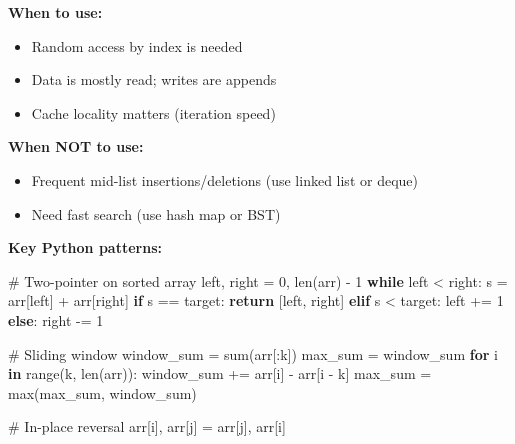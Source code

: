 \documentclass[11pt]{article}
\providecommand{\tightlist}{\setlength{\itemsep}{1pt}\setlength{\parskip}{0pt}}
\newenvironment{Shaded}{\begin{snugshade}}{\end{snugshade}}
\newcommand{\BuiltInTok}[1]{\textcolor[rgb]{0.50,0.55,0.55}{#1}}
\newcommand{\CommentTok}[1]{\textcolor[rgb]{0.48,0.49,0.49}{#1}}
\newcommand{\ControlFlowTok}[1]{\textcolor[rgb]{0.99,0.74,0.29}{\textbf{#1}}}
\newcommand{\DecValTok}[1]{\textcolor[rgb]{0.96,0.45,0.00}{#1}}
\newcommand{\KeywordTok}[1]{\textcolor[rgb]{0.81,0.81,0.76}{\textbf{#1}}}
\newcommand{\NormalTok}[1]{\textcolor[rgb]{0.81,0.81,0.76}{#1}}
\newcommand{\OperatorTok}[1]{\textcolor[rgb]{0.81,0.81,0.76}{#1}}
\begin{document}
\textbf{When to use:}

\begin{itemize}
\tightlist
\item
  Random access by index is needed
\item
  Data is mostly read; writes are appends
\item
  Cache locality matters (iteration speed)
\end{itemize}

\textbf{When NOT to use:}

\begin{itemize}
\tightlist
\item
  Frequent mid-list insertions/deletions (use linked list or deque)
\item
  Need fast search (use hash map or BST)
\end{itemize}

\textbf{Key Python patterns:}


\begin{Shaded}
\begin{Highlighting}[]
\CommentTok{\# Two{-}pointer on sorted array}
\NormalTok{left, right }\OperatorTok{=} \DecValTok{0}\NormalTok{, }\BuiltInTok{len}\NormalTok{(arr) }\OperatorTok{{-}} \DecValTok{1}
\ControlFlowTok{while}\NormalTok{ left }\OperatorTok{\textless{}}\NormalTok{ right:}
\NormalTok{    s }\OperatorTok{=}\NormalTok{ arr[left] }\OperatorTok{+}\NormalTok{ arr[right]}
    \ControlFlowTok{if}\NormalTok{ s }\OperatorTok{==}\NormalTok{ target: }\ControlFlowTok{return}\NormalTok{ [left, right]}
    \ControlFlowTok{elif}\NormalTok{ s }\OperatorTok{\textless{}}\NormalTok{ target: left }\OperatorTok{+=} \DecValTok{1}
    \ControlFlowTok{else}\NormalTok{: right }\OperatorTok{{-}=} \DecValTok{1}

\CommentTok{\# Sliding window}
\NormalTok{window\_sum }\OperatorTok{=} \BuiltInTok{sum}\NormalTok{(arr[:k])}
\NormalTok{max\_sum }\OperatorTok{=}\NormalTok{ window\_sum}
\ControlFlowTok{for}\NormalTok{ i }\KeywordTok{in} \BuiltInTok{range}\NormalTok{(k, }\BuiltInTok{len}\NormalTok{(arr)):}
\NormalTok{    window\_sum }\OperatorTok{+=}\NormalTok{ arr[i] }\OperatorTok{{-}}\NormalTok{ arr[i }\OperatorTok{{-}}\NormalTok{ k]}
\NormalTok{    max\_sum }\OperatorTok{=} \BuiltInTok{max}\NormalTok{(max\_sum, window\_sum)}

\CommentTok{\# In{-}place reversal}
\NormalTok{arr[i], arr[j] }\OperatorTok{=}\NormalTok{ arr[j], arr[i]}
\end{Highlighting}
\end{Shaded}
\end{document}

